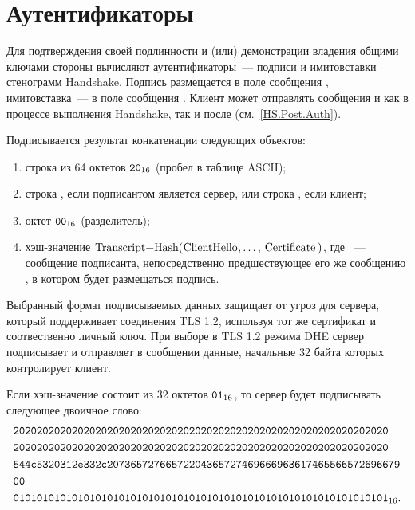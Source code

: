 \section{Аутентификаторы}\label{CRYPTO.Auth} 

Для подтверждения своей подлинности и (или) демонстрации владения общими ключами 
стороны вычисляют аутентификаторы~--- подписи и имитовставки стенограмм Handshake. 
%
Подпись размещается в поле  сообщения 
, имитовставка~--- в поле  
сообщения .
%
Клиент может отправлять сообщения  и 
 как в процессе выполнения Handshake, так и после 
(см.~\ref{HS.Post.Auth}).

Подписывается результат конкатенации следующих объектов: 
\begin{enumerate}[label=\arabic*)]
\item
строка из 64 октетов $\texttt{20}_{16}$ (пробел в таблице ASCII);
\item
строка , если подписантом 
является сервер, или строка , если 
клиент; 
%
%
\item
октет $\texttt{00}_{16}$ (разделитель);
\item
хэш-значение 
$\code{Transcript-Hash}(\code{ClientHello},\ldots,\code{Certificate})$, 
где ~--- сообщение подписанта, непосредственно 
предшествующее его же сообщению , в котором 
будет размещаться подпись.
\end{enumerate}

\begin{note*}
Выбранный формат подписываемых данных защищает от угроз для сервера, который
поддерживает соединения TLS 1.2, используя тот же сертификат и соотвественно
личный ключ. При выборе в TLS 1.2 режима DHE сервер подписывает и отправляет в
сообщении  данные, начальные 32 байта которых 
контролирует клиент.
\end{note*}


\begin{example*}
Если хэш-значение состоит из 32 октетов $\texttt{01}_{16}$, то сервер будет подписывать 
следующее двоичное слово:
\begin{align*}
&\texttt{2020202020202020202020202020202020202020202020202020202020202020}\\
&\texttt{2020202020202020202020202020202020202020202020202020202020202020}\\
&\texttt{544c5320312e332c20736572766572204365727469666963617465566572696679}\\
&\texttt{00}\\
&\texttt{0101010101010101010101010101010101010101010101010101010101010101}_{16}.
\end{align*}
\end{example*}

